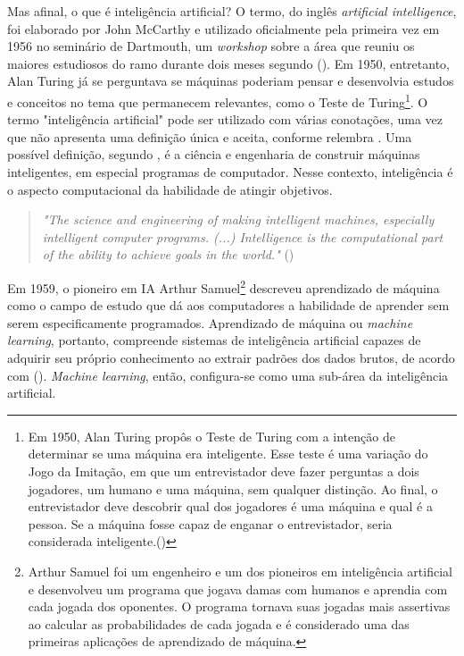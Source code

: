 Mas afinal, o que é inteligência artificial? O termo, do
inglês \textit{artificial intelligence}, foi elaborado por John McCarthy e utilizado 
oficialmente pela primeira vez em 1956 no seminário de 
Dartmouth, um \textit{workshop} sobre a área que reuniu os 
maiores estudiosos do ramo durante dois meses segundo (\cite{aima}).
Em 1950, entretanto, Alan Turing já se perguntava se máquinas 
poderiam pensar e desenvolvia estudos e conceitos no tema que permanecem relevantes,
como o Teste de Turing\footnote{Em 1950, Alan Turing propôs o 
Teste de Turing com a intenção de determinar se uma máquina era inteligente. Esse teste é uma variação 
do Jogo da Imitação, em que um entrevistador deve fazer perguntas a dois jogadores, um 
humano e uma máquina, sem qualquer distinção. Ao final, o entrevistador deve
descobrir qual dos jogadores é uma máquina e qual é a pessoa. Se 
a máquina fosse capaz de enganar o entrevistador, seria considerada
inteligente.(\cite{turing})}.
O termo "inteligência artificial" pode ser utilizado com
várias conotações, uma vez que não apresenta uma definição 
única e aceita, conforme 
relembra \cite{wang2019defining}. Uma possível definição,
segundo \cite{what-is-ai}, é a ciência e engenharia de 
construir máquinas inteligentes, em especial programas 
de computador. Nesse contexto, inteligência é o aspecto
computacional da habilidade de atingir objetivos.

\begin{quote}
  \textit{"The science and
  engineering of making intelligent machines, 
  especially intelligent computer programs. (...)
  Intelligence is the computational part of the ability 
  to achieve goals in the world."} (\cite{what-is-ai})
\end{quote}

Em 1959, o pioneiro em IA Arthur Samuel\footnote{Arthur Samuel
foi um engenheiro e um dos pioneiros em inteligência artificial e
desenvolveu um programa que jogava damas com humanos e aprendia
com cada jogada dos oponentes. O programa tornava suas jogadas mais 
assertivas ao calcular as probabilidades de cada jogada e é 
considerado uma das primeiras aplicações de aprendizado de máquina.
} descreveu 
aprendizado de máquina como o campo de estudo que dá aos 
computadores a habilidade de aprender sem serem especificamente
programados. Aprendizado de máquina ou \textit{machine learning}, 
portanto, compreende sistemas de inteligência 
artificial capazes de adquirir seu próprio conhecimento 
ao extrair padrões dos dados brutos, de acordo com (\cite{Goodfellow-et-al-2016}).
\textit{Machine learning}, então, configura-se como uma 
sub-área da inteligência artificial.


